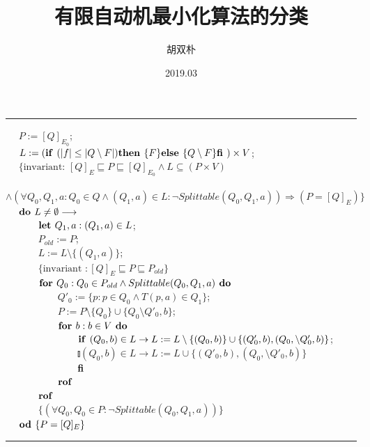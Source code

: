 \documentclass[UTF8,zihao=-4]{ctexbook}
\title{有限自动机最小化算法的分类}
\author{胡双朴}
\date{2019.03}
\begin{document}
\newline
\rule{\textwidth}{1pt}
\mbox{　} $P:=[Q]_{E_0}$; \\
\mbox{　} $L:= ( \mbox{\textbf{if }} ( |f| \leq |Q \setminus F | ) \mbox{\textbf{then }} \{F\} \mbox{\textbf{else }} \{ Q \setminus F \} \mbox{\textbf{fi }} ) \times V $; \\
\mbox{　} $ \{ \mbox{invariant: } [Q]_E \sqsubseteq P \sqsubseteq [Q]_{E_0} \land L \subseteq (P \times V) $ \\
\mbox{　　　} $ \land (\forall Q_0,Q_1,a:Q_0 \in Q \land (Q_1,a) \in L : \neg Splittable (Q_0,Q_1,a)) \Rightarrow (P=[Q]_E) \} $ \\
\mbox{　} $ \mbox{\textbf{do }} L \not= \emptyset \longrightarrow $ \\ 
\mbox{　　　} $ \mbox{\textbf{let }} Q_1,a:(Q_1,a) \in L $; \\
\mbox{　　　} $ P_{old} := P $; \\
\mbox{　　　} $ L := L \setminus \{ (Q_1,a) \} $; \\
\mbox{　　　} $ \{  \mbox{invariant }: [Q]_E \sqsubseteq P \sqsubseteq P_{old} \} $ \\
\mbox{　　　} $ \mbox{\textbf{for }} Q_0 : Q_0 \in P_{old} \land Splittable (Q_0,Q_1,a) \mbox{\textbf{ do }} $ \\
\mbox{　　　　　} $ Q'_0 := \{ p:p \in Q_0 \land T(p,a) \in Q_1 \} $; \\
\mbox{　　　　　} $ P:= P \setminus \{ Q_0 \} \cup \{ Q_0 \setminus Q'_0,b \} $;\\
\mbox{　　　　　} $ \mbox{\textbf{for }} b:b \in V \mbox{\textbf{ do }} $ \\
\mbox{　　　　　　　} $ \mbox{\textbf{if }} (Q_0,b) \in L \rightarrow L := L \setminus \{ (Q_0,b) \} \cup \{ (Q'_0,b),(Q_0, \setminus Q'_0,b ) \} $;\\ 
\mbox{　　　　　　　} $ \talloblong (Q_0,b) \in L \rightarrow L := L \cup \{ (Q'_0,b),(Q_0, \setminus Q'_0,b ) \} $ \\
\mbox{　　　　　　　} $ \mbox{\textbf{fi}} $ \\
\mbox{　　　　　} $ \mbox{\textbf{rof}} $ \\
\mbox{　　　} $ \mbox{\textbf{rof}} $ \\
\mbox{　　　} $ \{ (\forall Q_0,Q_0 \in P : \neg Splittable(Q_0,Q_1,a)) \} $ \\
\mbox{　} $ \mbox{\textbf{od }} \{ P = [Q]_E \} $ \\
\rule{\textwidth}{1pt}
\end{document}
